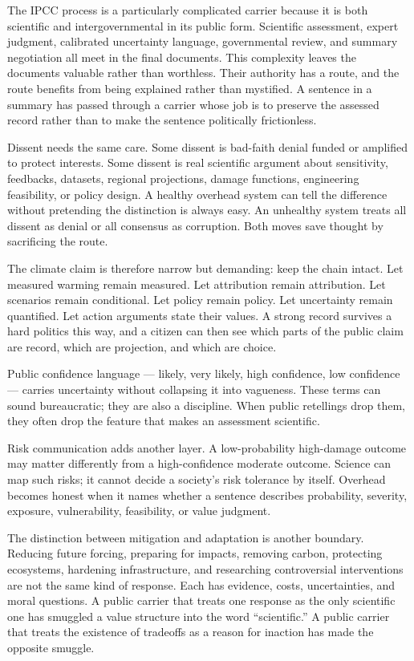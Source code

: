 The IPCC process is a particularly complicated carrier because it is
both scientific and intergovernmental in its public form. Scientific
assessment, expert judgment, calibrated uncertainty language,
governmental review, and summary negotiation all meet in the final
documents. This complexity leaves the documents valuable rather than
worthless. Their authority has a route, and the route benefits from
being explained rather than mystified. A sentence in a summary has
passed through a carrier whose job is to preserve the assessed record
rather than to make the sentence politically frictionless.

Dissent needs the same care. Some dissent is bad-faith denial funded or
amplified to protect interests. Some dissent is real scientific
argument about sensitivity, feedbacks, datasets, regional projections,
damage functions, engineering feasibility, or policy design. A healthy
overhead system can tell the difference without pretending the
distinction is always easy. An unhealthy system treats all dissent as
denial or all consensus as corruption. Both moves save thought by
sacrificing the route.

The climate claim is therefore narrow but demanding: keep the chain
intact. Let measured warming remain measured. Let attribution remain
attribution. Let scenarios remain conditional. Let policy remain
policy. Let uncertainty remain quantified. Let action arguments state
their values. A strong record survives a hard politics this way, and
a citizen can then see which parts of the public claim are record,
which are projection, and which are choice.

Public confidence language --- likely, very likely, high confidence,
low confidence --- carries uncertainty without collapsing it into
vagueness. These terms can sound bureaucratic; they are also a
discipline. When public retellings drop them, they often drop the
feature that makes an assessment scientific.

Risk communication adds another layer. A low-probability high-damage
outcome may matter differently from a high-confidence moderate
outcome. Science can map such risks; it cannot decide a society's risk
tolerance by itself. Overhead becomes honest when it names whether a
sentence describes probability, severity, exposure, vulnerability,
feasibility, or value judgment.

The distinction between mitigation and adaptation is another boundary.
Reducing future forcing, preparing for impacts, removing carbon,
protecting ecosystems, hardening infrastructure, and researching
controversial interventions are not the same kind of response. Each
has evidence, costs, uncertainties, and moral questions. A public
carrier that treats one response as the only scientific one has
smuggled a value structure into the word ``scientific.'' A public
carrier that treats the existence of tradeoffs as a reason for inaction
has made the opposite smuggle.

